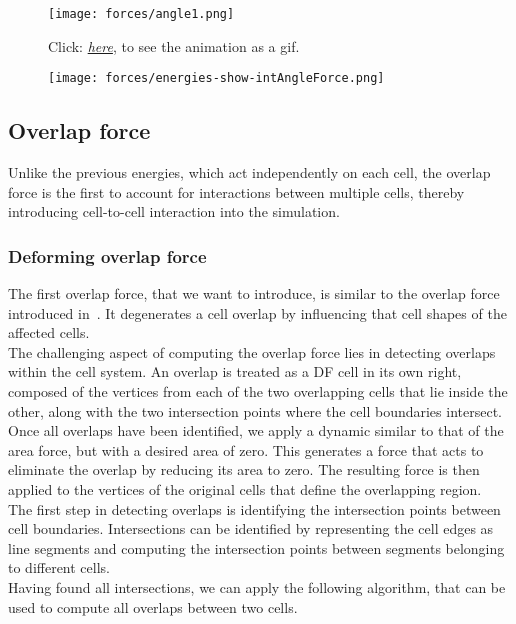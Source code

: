 \begin{figure}
	\begin{center}
		\texttt{[image: forces/angle1.png]}
		\caption{Click: \href{https://github.com/tivo476c/FlexibleCellModel/blob/master/figures/gifs/showForces/show-intAngleForce.gif}{\textit{here}}, to see the animation as a gif.
		}
		\label{fig:angleForce}
	\end{center}
\end{figure}

\begin{figure}
	\begin{center}
		\texttt{[image: forces/energies-show-intAngleForce.png]}
		\caption{}
		\label{fig:intAngleEnergy}
	\end{center}
\end{figure}







 

\subsection{Overlap force}
Unlike the previous energies, which act independently on each cell, the overlap force is the first to account for interactions between multiple cells, thereby introducing cell-to-cell interaction into the simulation. \\

\subsubsection*{Deforming overlap force}
The first overlap force, that we want to introduce, is similar to the overlap force introduced in~\cite{Vogel2023}. 
It degenerates a cell overlap by influencing that cell shapes of the affected cells. \\
The challenging aspect of computing the overlap force lies in detecting overlaps within the cell system. 
An overlap is treated as a DF cell in its own right, composed of the vertices from each of the two overlapping cells that lie inside the other, along with the two intersection points where the cell boundaries intersect. \\ 
Once all overlaps have been identified, we apply a dynamic similar to that of the area force, but with a desired area of zero. 
This generates a force that acts to eliminate the overlap by reducing its area to zero. 
The resulting force is then applied to the vertices of the original cells that define the overlapping region. \\
The first step in detecting overlaps is identifying the intersection points between cell boundaries.
Intersections can be identified by representing the cell edges as line segments and computing the intersection points between segments belonging to different cells. \\
Having found all intersections, we can apply the following algorithm, that can be used to compute all overlaps between two cells. 

